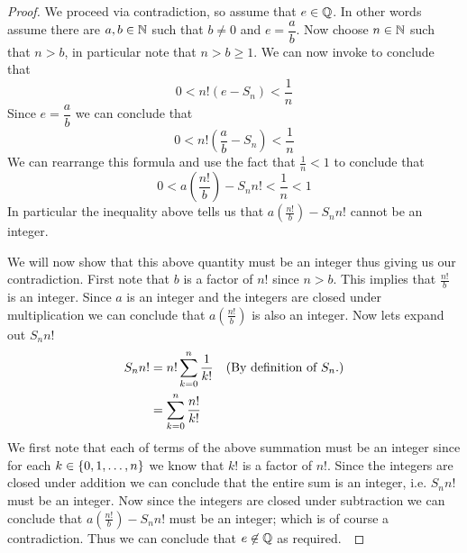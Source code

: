         \begin{proof}
            We proceed via contradiction, so assume that $e \in \mathbb{Q}$. In other
            words assume there are $a, b \in \mathbb{N}$ such that $b \neq 0$ and $e = \dfrac{a}{b}$.
            Now choose $n \in \mathbb{N}$ such that $n > b$, in particular note that $n > b \ge 1$.
            We can now invoke  to conclude that
            \begin{equation*}
                0 < n! (e - S_n) < \frac{1}{n}
            \end{equation*}
            Since $e = \dfrac{a}{b}$ we can conclude that
            \begin{equation*}
                0 < n! \left(\frac{a}{b} - S_n\right) < \frac{1}{n}
            \end{equation*}
            We can rearrange this formula and use the fact that $\frac{1}{n} < 1$ to conclude that
            \begin{equation}
                0 < a \left(\frac{n!}{b}\right) - S_n n! < \frac{1}{n} < 1
            \end{equation}
            In particular the inequality above tells us that $a \left(\frac{n!}{b}\right) - S_n n!$
            cannot be an integer.

            We will now show that this above quantity must be an integer thus giving us our contradiction.
            First note that $b$ is a factor of $n!$ since $n > b$.
            This implies that $\frac{n!}{b}$ is an integer. Since $a$ is an integer and the
            integers are closed under multiplication we can conclude that $a \left(\frac{n!}{b}\right)$
            is also an integer. Now lets expand out $S_n n!$
            \begin{align*}
                S_n n! &= n! \sum_{k = 0}^{n} \frac{1}{k!} & (\mbox{By definition of $S_n$.}) \\
                       &= \sum_{k = 0}^{n} \frac{n!}{k!} 
            \end{align*}
            We first note that each of terms of the above summation must be an integer since
            for each $k \in \left\{0, 1, \dots, n\right\}$ we know that $k!$ is a factor of $n!$. Since
            the integers are closed under addition we can conclude that the entire sum is an
            integer, i.e. $S_n n!$ must be an integer. Now since the integers are closed under
            subtraction we can conclude that $a\left(\frac{n!}{b}\right) - S_n n!$ must be an
            integer; which is of course a contradiction. Thus we can conclude that $e \not\in \mathbb{Q}$
            as required.~\QED
        \end{proof}
